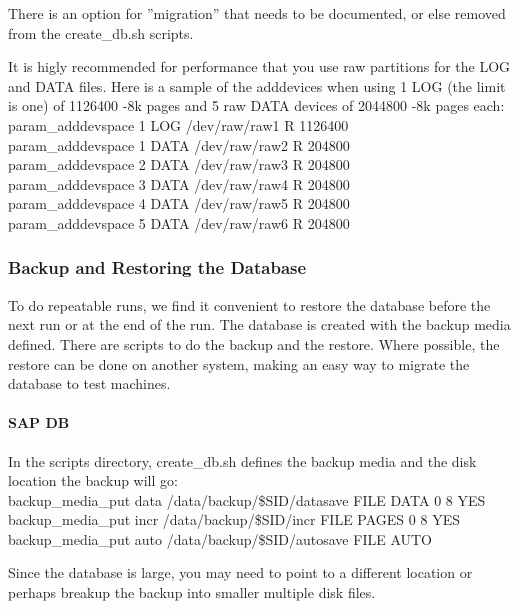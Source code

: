 \documentclass{article}
\begin{document}
\noindent
There is an option for ''migration'' that needs to be documented, or else
removed from the create\_db.sh scripts.

\noindent
It is higly recommended for performance that you use raw partitions for the
LOG and DATA files.  Here is a sample of the adddevices when using 1 LOG (the
limit is one)  of 1126400 -8k pages and 5 raw DATA devices of 2044800 -8k
pages each: \\
\indent param\_adddevspace 1 LOG  /dev/raw/raw1 R 1126400 \\
\indent param\_adddevspace 1 DATA /dev/raw/raw2 R 204800 \\
\indent param\_adddevspace 2 DATA /dev/raw/raw3 R 204800 \\
\indent param\_adddevspace 3 DATA /dev/raw/raw4 R 204800 \\
\indent param\_adddevspace 4 DATA /dev/raw/raw5 R 204800 \\
\indent param\_adddevspace 5 DATA /dev/raw/raw6 R 204800

\subsubsection{Backup and Restoring the Database}

To do repeatable runs, we find it convenient to restore the database before
the next run or at the end of the run.  The database is created with the
backup media defined.  There are scripts to do the backup and the restore.
Where possible, the restore can be done on another system, making an easy way
to migrate the database to test machines.

\paragraph{SAP DB}

In the scripts directory, create\_db.sh defines the backup media and the disk
location the backup will go: \\
\indent backup\_media\_put data /data/backup/\$SID/datasave FILE DATA 0 8 YES \\
\indent backup\_media\_put incr /data/backup/\$SID/incr FILE PAGES 0 8 YES \\
\indent backup\_media\_put auto /data/backup/\$SID/autosave FILE AUTO

\noindent
Since the database is large, you may need to point to a different location or
perhaps breakup the backup into smaller multiple disk files. 
\end{document}
